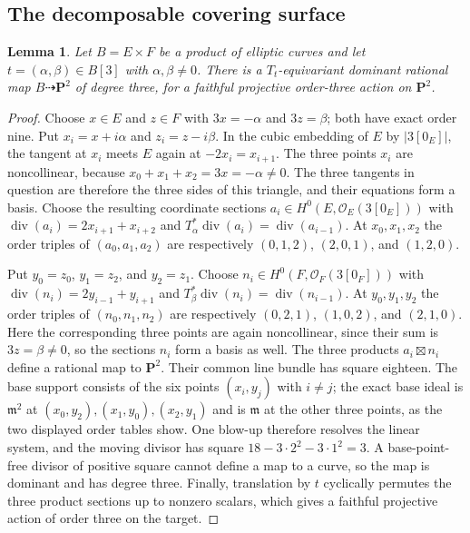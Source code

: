 \documentclass[12pt]{amsart}
\numberwithin{equation}{section}
\newtheorem{lemma}[theorem]{Lemma}
\theoremstyle{definition}
\theoremstyle{remark}
\newcommand{\PP}{\mathbf P}
\begin{document}
\subsection{The decomposable covering surface}

\begin{lemma}\label{lem:equivariant-product}
Let $B=E\times F$ be a product of elliptic curves and let
$t=(\alpha,\beta)\in B[3]$ with $\alpha,\beta\ne0$.  There is a
$T_t$-equivariant dominant rational map $B\dashrightarrow\PP^2$ of
degree three, for a faithful projective order-three action on $\PP^2$.
\end{lemma}

\begin{proof}
Choose $x\in E$ and $z\in F$ with $3x=-\alpha$ and $3z=\beta$; both
have exact order nine.  Put $x_i=x+i\alpha$ and $z_i=z-i\beta$.  In the
cubic embedding of $E$ by $|3[0_E]|$, the tangent at $x_i$ meets $E$
again at $-2x_i=x_{i+1}$.  The three points $x_i$ are noncollinear,
because $x_0+x_1+x_2=3x=-\alpha\ne0$.  The three tangents in question
are therefore the three sides of this triangle, and their equations form
a basis.  Choose the resulting coordinate sections
$a_i\in H^0(E,\mathcal O_E(3[0_E]))$ with
$\operatorname{div}(a_i)=2x_{i+1}+x_{i+2}$ and
$T_\alpha^*\operatorname{div}(a_i)= \operatorname{div}(a_{i-1})$.  At $x_0,x_1,x_2$ the order triples of
$(a_0,a_1,a_2)$ are respectively $(0,1,2)$, $(2,0,1)$, and $(1,2,0)$.

Put $y_0=z_0$, $y_1=z_2$, and $y_2=z_1$.  Choose
$n_i\in H^0(F,\mathcal O_F(3[0_F]))$ with
$\operatorname{div}(n_i)=2y_{i-1}+y_{i+1}$ and
$T_\beta^*\operatorname{div}(n_i) = \operatorname{div}(n_{i-1})$.  At $y_0,y_1,y_2$ the order triples of
$(n_0,n_1,n_2)$ are respectively $(0,2,1)$, $(1,0,2)$, and $(2,1,0)$.
Here the corresponding three points are again noncollinear, since their
sum is $3z=\beta\ne0$, so the sections $n_i$ form a basis as well.
The three products $a_i\boxtimes n_i$ define a rational map to $\PP^2$.
Their common line bundle has square eighteen.  The base support consists
of the six points $(x_i,y_j)$ with $i\ne j$; the exact base ideal is
$\mathfrak m^2$ at $(x_0,y_2),(x_1,y_0),(x_2,y_1)$ and is
$\mathfrak m$ at the other three points, as the two displayed order
tables show.  One blow-up therefore resolves the linear system, and the
moving divisor has square $18-3\cdot2^2-3\cdot1^2=3$.  A base-point-free
divisor of positive square cannot define a map to a curve, so the map is
dominant and has degree three.  Finally, translation by $t$ cyclically
permutes the
three product sections up to nonzero scalars, which gives a faithful
projective action of order three on the target.
\end{proof}
\end{document}
